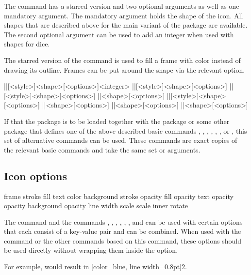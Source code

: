 \documentclass[a4paper]{article}
\begin{document}
The \macro{\DndIconsUseIcon} command has a starred version and two optional arguments as well as one mandatory argument. The mandatory argument holds the shape of the icon. All shapes that are described above for the main variant of the package are available. The second optional argument can be used to add an integer when used with shapes for dice.

The starred version of the command is used to fill a frame with color instead of drawing its outline. Frames can be put around the shape via the relevant  option. 

\begin{macrodef}
|\DndiconsDie|[<style>]{<shape>}[<options>]{<integer>}
|\DndiconsAbiliy|[<style>]{<shape>}[<options>]
|\DndiconsSaving|[<style>]{<shape>}[<options>]
|\DndiconsSpell|{<shape>}[<options>]
|\DndiconsSpellschool|[<style>]{<shape>}[<options>]
|\DndiconsDamage|{<shape>}[<options>]
|\DndiconsAttack|{<shape>}[<options>]
|\DndiconsCondition|{<shape>}[<options>]
\end{macrodef}
If that the  package is to be loaded together with the  package or some other package that defines one of the above described basic commands \macro{\die}, \macro{\ability}, \macro{\saving}, \macro{\spell}, \macro{\spellschool}, \macro{\damage}, \macro{\attack} or \macro{\condition}, this set of alternative commands can be used. These commands are exact copies of the relevant basic commands and take the same set or arguments. 

\subsection{Icon options}

\begin{macrodef}
frame
stroke
fill
text
color
background
stroke opacity 
fill opacity
text opacity
opacity 
background opacity
line width
scale
scale inner
rotate
\end{macrodef}
The \macro{\DndIconsUseIcon} command and the commands \macro{\die}, \macro{\ability}, \macro{\saving}, \macro{\spell}, \macro{\spellschool}, \macro{\damage}, \macro{\attack} and \macro{\condition} can be used with certain options that each consist of a key-value pair and can be combined. When used with the \macro{\DndIconsUseIcon} command or the other commands based on this command, these options should be used directly without wrapping them inside the  option. 

For example,  would result in [color=blue, line width=0.8pt]{2}.
\end{document}
